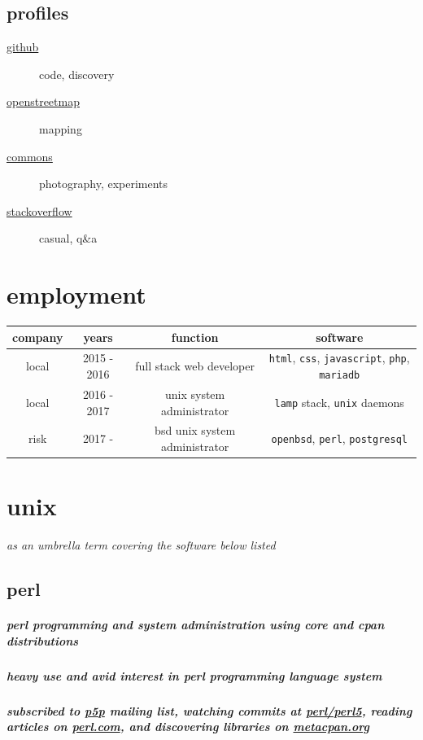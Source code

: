 \documentclass{article}
\begin{document}
     \subsection{profiles}
       \begin{description}
         \item[\href{https://github.com/rwp0}{github}] code, discovery
         \item[\href{https://www.openstreetmap.org/user/rwp_}{openstreetmap}] mapping
         \item[\href{https://commons.wikimedia.org/wiki/User:Rwp0}{commons}] photography, experiments
         \item[\href{https://stackoverflow.com/users/13762488/rwp}{stackoverflow}] casual, q\&a
       \end{description}

  \section{employment}
    \begin{tabular}{ c | c | c | c }
      \hline			
      company & years & function & software \\
      \hline  
      local & 2015 - 2016 & full stack web developer & \verb|html|, \verb|css|, \verb|javascript|, \verb|php|, \verb|mariadb| \\
      local & 2016 - 2017 & unix system administrator & \verb|lamp| stack, \verb|unix| daemons \\
      risk & 2017 - & bsd unix system administrator & \verb|openbsd|, \verb|perl|, \verb|postgresql| \\
      \hline  
    \end{tabular}

  \section{unix} %
    \textit{as an umbrella term covering the software below listed}
    \subsection{perl}
      \subparagraph{perl programming and system administration using core and cpan distributions}
      \subparagraph{heavy use and avid interest in perl programming language system}
      \subparagraph{subscribed to \href{https://lists.perl.org/list/perl5-porters.html}{p5p} mailing list, watching commits at \href{https://github.com/Perl/perl5}{perl/perl5}, reading articles on \href{https://perl.com/}{perl.com}, and discovering libraries on \href{https://metacpan.org/}{metacpan.org}}
\end{document}
